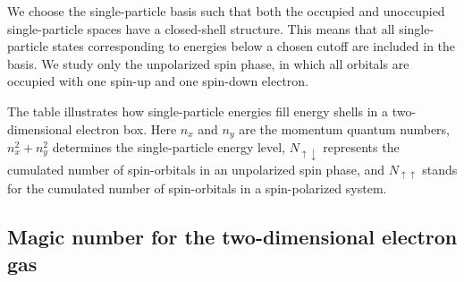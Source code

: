 \documentclass[%
twoside,                 %
final,                   %
10pt]{article}
\begin{document}
We choose  the single-particle basis such that both the occupied and 
unoccupied single-particle spaces have a closed-shell 
structure. This means that all single-particle states 
corresponding to energies below a chosen cutoff are
included in the basis. We study only the unpolarized spin
phase, in which all orbitals are occupied with one spin-up 
and one spin-down electron. 


The table illustrates  how single-particle energies
    fill energy shells in a two-dimensional electron box.
  Here $n_{x}$ and $n_{y}$ are the momentum quantum numbers,
  $n_{x}^{2} + n_{y}^{2}$ determines the single-particle 
  energy level, $N_{\uparrow \downarrow }$ represents the 
  cumulated number of spin-orbitals in an unpolarized spin
  phase, and $N_{\uparrow \uparrow }$ stands for the
  cumulated number of spin-orbitals in a spin-polarized
  system.




\subsection{Magic number for the two-dimensional electron gas}
\end{document}
